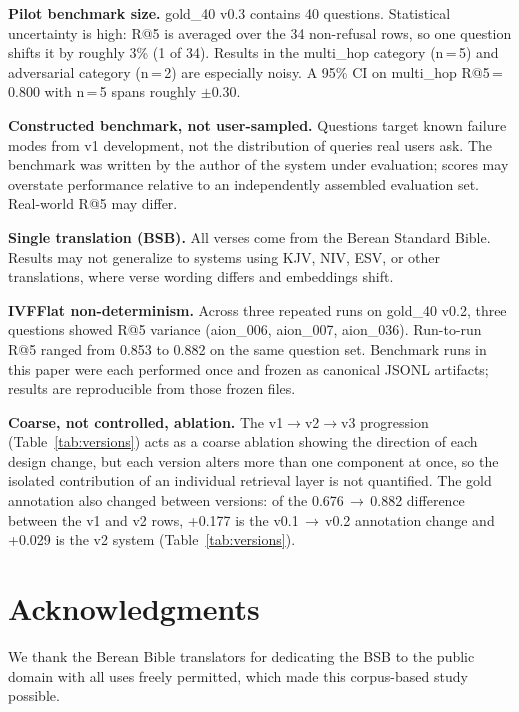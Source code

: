 \documentclass[11pt]{article}
\begin{document}
\textbf{Pilot benchmark size.} gold\_40 v0.3 contains 40 questions. Statistical uncertainty is high: R@5 is averaged over the 34 non-refusal rows, so one question shifts it by roughly 3\% (1 of 34). Results in the multi\_hop category (n\,=\,5) and adversarial category (n\,=\,2) are especially noisy. A 95\% CI on multi\_hop R@5\,=\,0.800 with n\,=\,5 spans roughly $\pm$0.30.

\textbf{Constructed benchmark, not user-sampled.} Questions target known failure modes from v1 development, not the distribution of queries real users ask. The benchmark was written by the author of the system under evaluation; scores may overstate performance relative to an independently assembled evaluation set. Real-world R@5 may differ.

\textbf{Single translation (BSB).} All verses come from the Berean Standard Bible. Results may not generalize to systems using KJV, NIV, ESV, or other translations, where verse wording differs and embeddings shift.

\textbf{IVFFlat non-determinism.} Across three repeated runs on gold\_40 v0.2, three questions showed R@5 variance (aion\_006, aion\_007, aion\_036). Run-to-run R@5 ranged from 0.853 to 0.882 on the same question set. Benchmark runs in this paper were each performed once and frozen as canonical JSONL artifacts; results are reproducible from those frozen files.

\textbf{Coarse, not controlled, ablation.} The v1$\to$v2$\to$v3 progression (Table~\ref{tab:versions}) acts as a coarse ablation showing the direction of each design change, but each version alters more than one component at once, so the isolated contribution of an individual retrieval layer is not quantified. The gold annotation also changed between versions: of the 0.676\,$\to$\,0.882 difference between the v1 and v2 rows, +0.177 is the v0.1\,$\to$\,v0.2 annotation change and +0.029 is the v2 system (Table~\ref{tab:versions}).

\section*{Acknowledgments}

We thank the Berean Bible translators for dedicating the BSB to the public domain with all uses freely permitted, which made this corpus-based study possible.
\end{document}
